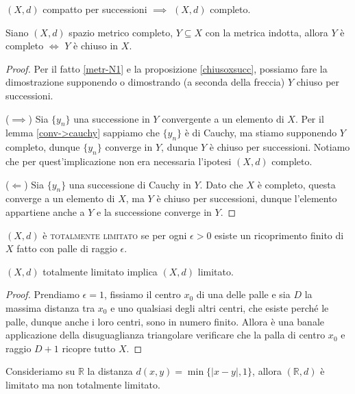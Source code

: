 \begin{cor} \label{cs->compl}
  $(X, d)$ compatto per successioni $\implies$ $(X, d)$ completo.
\end{cor}

\begin{lm}
  Siano $(X, d)$ spazio metrico completo, $Y \subseteq X$ con la metrica indotta, allora $Y$ è completo $\Leftrightarrow$ $Y$ è chiuso in $X$.
\end{lm}

\begin{proof}
  Per il fatto \ref{metr-N1} e la proposizione \ref{chiusoxsucc}, possiamo fare la dimostrazione supponendo o dimostrando (a seconda della freccia) $Y$ chiuso per successioni.

  ($\implies$) Sia $\{y_n\}$ una successione in $Y$ convergente a un elemento di $X$. Per il lemma \ref{conv->cauchy} sappiamo che $\{y_n\}$ è di Cauchy, ma stiamo supponendo $Y$ completo, dunque $\{y_n\}$ converge in $Y$, dunque $Y$ è chiuso per successioni. Notiamo che per quest'implicazione non era necessaria l'ipotesi $(X, d)$ completo.

  ($\Leftarrow$) Sia $\{y_n\}$ una successione di Cauchy in $Y$. Dato che $X$ è completo, questa converge a un elemento di $X$, ma $Y$ è chiuso per successioni, dunque l'elemento appartiene anche a $Y$ e la successione converge in $Y$.
\end{proof}

\begin{defn}
  $(X, d)$ è \textsc{totalmente limitato} se per ogni $\epsilon>0$ esiste un ricoprimento finito di $X$ fatto con palle di raggio $\epsilon$.
\end{defn}

\begin{lm}
  $(X, d)$ totalmente limitato implica $(X, d)$ limitato.
\end{lm}

\begin{proof}
  Prendiamo $\epsilon=1$, fissiamo il centro $x_0$ di una delle palle e sia $D$ la massima distanza tra $x_0$ e uno qualsiasi degli altri centri, che esiste perché le palle, dunque anche i loro centri, sono in numero finito. Allora è una banale applicazione della disuguaglianza triangolare verificare che la palla di centro $x_0$ e raggio $D+1$ ricopre tutto $X$.
\end{proof}

\begin{ex}
  Consideriamo su $\mathbb{R}$ la distanza $d(x, y)=\min{\{|x-y|, 1\}}$, allora $(\mathbb{R}, d)$ è limitato ma non totalmente limitato.
\end{ex}

